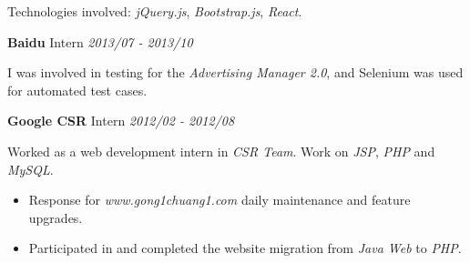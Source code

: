 \documentclass[a4paper]{article}
\newenvironment{changemargin}[2]{%
  \begin{list}{}{%
    \setlength{\topsep}{0pt}%
    \setlength{\leftmargin}{#1}%
    \setlength{\rightmargin}{#2}%
    \setlength{\listparindent}{\parindent}%
    \setlength{\itemindent}{\parindent}%
    \setlength{\parsep}{\parskip}%
  }%
  \item[]}{\end{list}
}
\newenvironment{body} {
	\vspace*{-16pt}
	\begin{changemargin}{-0.5in}{-0.5in}
  }
	{\end{changemargin}
}
\begin{document}
\begin{body}
	Technologies involved: \emph{jQuery.js}, \emph{Bootstrap.js}, \emph{React}.\\

	\medskip
	
	\textbf{Baidu} \hfill Intern \emph{2013/07 - 2013/10}\\ 

	\begin{justify}
		I was involved in testing for the \emph{Advertising Manager 2.0}, and Selenium was used for automated test cases.
	\end{justify}

	\medskip
	
	\textbf{Google CSR} \hfill Intern \emph{2012/02 - 2012/08}\\ 
	
	\begin{justify}
		Worked as a web development intern in \emph{CSR Team}. Work on \emph{JSP}, \emph{PHP} and \emph{MySQL}.
	\end{justify}
	\smallskip
	
	\vspace*{-8pt}
	\begin{itemize} \itemsep -0pt  %
		\item \begin{justify}
			Response for \emph{www.gong1chuang1.com} daily maintenance and feature upgrades.
		\end{justify}
	\end{itemize}

	\vspace*{-8pt}
	\begin{itemize} \itemsep -0pt  %
		\item \begin{justify}
			Participated in and completed the website migration from \emph{Java Web} to \emph{PHP}.
		\end{justify}
	\end{itemize}

\end{body}

\medskip
\end{document}
